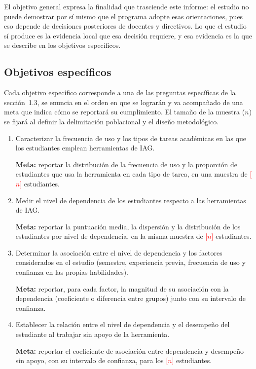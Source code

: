 \documentclass[12pt,letterpaper]{article}
\newcommand{\pendiente}[1]{\textcolor{red}{[#1]}}
\begin{document}
El objetivo general expresa la finalidad que trasciende este informe: el estudio no puede demostrar por sí mismo que el programa adopte esas orientaciones, pues eso depende de decisiones posteriores de docentes y directivos. Lo que el estudio sí produce es la evidencia local que esa decisión requiere, y esa evidencia es la que se describe en los objetivos específicos.

\subsection{Objetivos específicos}

Cada objetivo específico corresponde a una de las preguntas específicas de la sección~1.3, se enuncia en el orden en que se lograrán y va acompañado de una meta que indica cómo se reportará su cumplimiento. El tamaño de la muestra ($n$) se fijará al definir la delimitación poblacional y el diseño metodológico.

\begin{enumerate}
  \item Caracterizar la frecuencia de uso y los tipos de tareas académicas en las que los estudiantes emplean herramientas de IAG.

  \textbf{Meta:} reportar la distribución de la frecuencia de uso y la proporción de estudiantes que usa la herramienta en cada tipo de tarea, en una muestra de \pendiente{$n$} estudiantes.

  \item Medir el nivel de dependencia de los estudiantes respecto a las herramientas de IAG.

  \textbf{Meta:} reportar la puntuación media, la dispersión y la distribución de los estudiantes por nivel de dependencia, en la misma muestra de \pendiente{$n$} estudiantes.

  \item Determinar la asociación entre el nivel de dependencia y los factores considerados en el estudio (semestre, experiencia previa, frecuencia de uso y confianza en las propias habilidades).

  \textbf{Meta:} reportar, para cada factor, la magnitud de su asociación con la dependencia (coeficiente o diferencia entre grupos) junto con su intervalo de confianza.

  \item Establecer la relación entre el nivel de dependencia y el desempeño del estudiante al trabajar sin apoyo de la herramienta.

  \textbf{Meta:} reportar el coeficiente de asociación entre dependencia y desempeño sin apoyo, con su intervalo de confianza, para los \pendiente{$n$} estudiantes.
\end{enumerate}
\end{document}
